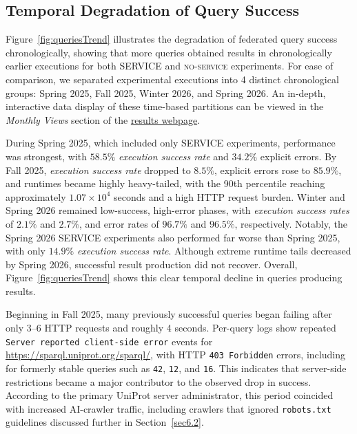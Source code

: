 \documentclass[runningheads]{llncs}
\begin{document}
\subsection{Temporal Degradation of Query Success}\label{sec5.1}


Figure~\ref{fig:queriesTrend} illustrates the degradation of federated query success chronologically, showing that more queries obtained results in chronologically earlier executions for both \textsc{SERVICE} and \textsc{no-service} experiments.
For ease of comparison, we separated experimental executions into 4 distinct chronological groups: Spring 2025, Fall 2025, Winter 2026, and Spring 2026.
An in-depth, interactive data display of these time-based partitions can be viewed in the \textit{Monthly Views} section of the \href{https://ecrum19.github.io/fed-survey-results/}{results webpage}.

During Spring 2025, which included only \textsc{SERVICE} experiments, performance was strongest, with \(58.5\%\) \emph{execution success rate} and \(34.2\%\) explicit errors.
By Fall 2025, \emph{execution success rate} dropped to \(8.5\%\), explicit errors rose to \(85.9\%\), and runtimes became highly heavy-tailed, with the 90th percentile reaching approximately \(1.07\times 10^4\) seconds and a high HTTP request burden.
Winter and Spring 2026 remained low-success, high-error phases, with \emph{execution success rates} of \(2.1\%\) and \(2.7\%\), and error rates of \(96.7\%\) and \(96.5\%\), respectively.
Notably, the Spring 2026 \textsc{SERVICE} experiments also performed far worse than Spring 2025, with only \(14.9\%\) \emph{execution success rate}.
Although extreme runtime tails decreased by Spring 2026, successful result production did not recover.
Overall, Figure~\ref{fig:queriesTrend} shows this clear temporal decline in queries producing results.

Beginning in Fall 2025, many previously successful queries began failing after only 3--6 HTTP requests and roughly 4 seconds. 
Per-query logs show repeated \texttt{Server reported client-side error} events for \url{https://sparql.uniprot.org/sparql/}, with HTTP \texttt{403 Forbidden} errors, including for formerly stable queries such as \texttt{42}, \texttt{12}, and \texttt{16}. 
This indicates that server-side restrictions became a major contributor to the observed drop in success. 
According to the primary UniProt server administrator, this period coincided with increased AI-crawler traffic, including crawlers that ignored \texttt{robots.txt} guidelines discussed further in Section~\ref{sec6.2}.
\end{document}
